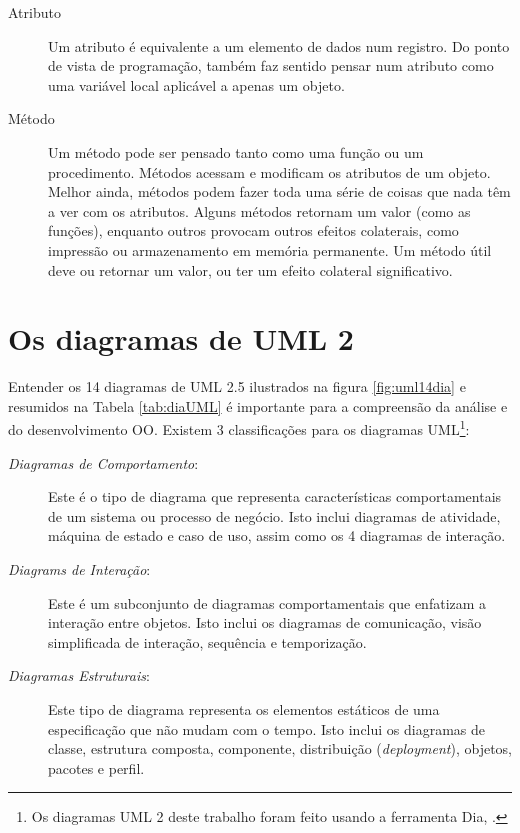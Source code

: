 \documentclass[
	article,			%
	12pt,				%
	openright,
	twoside,			%
	a4paper,			%
	english,			%
	french,
	brazil,				%
	sumario=tradicional
	]{abntex2}
\begin{document}
\begin{description}
\item[Atributo] Um atributo é equivalente a um elemento de dados num registro. Do ponto de vista de programação, também faz sentido pensar num atributo como uma variável local aplicável a apenas um objeto.

\item[Método] Um método pode ser pensado tanto como uma função ou um procedimento. Métodos acessam e modificam os atributos de um objeto. Melhor ainda, métodos podem fazer toda uma série de coisas que nada têm a ver com os atributos. Alguns métodos retornam um valor (como as funções), enquanto outros provocam outros efeitos colaterais, como impressão ou armazenamento em memória permanente. Um método útil deve ou retornar um valor, ou ter um efeito colateral significativo.
\end{description}

\section{Os diagramas de UML 2}

Entender os 14 diagramas de UML 2.5 ilustrados na figura \ref{fig:uml14dia} e resumidos na Tabela \ref{tab:diaUML} é importante para a compreensão da análise e do desenvolvimento OO. Existem 3 classificações para os diagramas UML\footnote{Os diagramas UML 2 deste trabalho foram feito usando a ferramenta Dia, .}:

\begin{description}
\item[\emph{Diagramas de Comportamento}:] Este é o tipo de diagrama que representa características comportamentais de um sistema ou processo de negócio. Isto inclui diagramas de atividade, máquina de estado e caso de uso, assim como os 4 diagramas de interação.

\item[\emph{Diagrams de Interação}:] Este é um subconjunto de diagramas comportamentais que enfatizam a interação entre objetos. Isto inclui os diagramas de comunicação, visão simplificada de interação, sequência e temporização.

\item[\emph{Diagramas Estruturais}:] Este tipo de diagrama representa os elementos estáticos de uma especificação que não mudam com o tempo. Isto inclui os diagramas de classe, estrutura composta, componente, distribuição (\textit{deployment}), objetos, pacotes e perfil.
\end{description}
\end{document}
